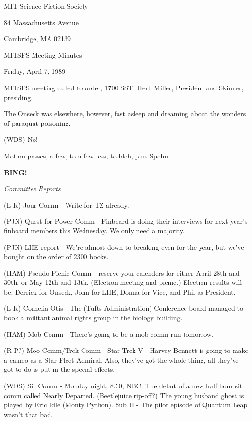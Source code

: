 \documentclass[12pt]{article}
\newcommand{\bing}{{\bf BING!} }
\newcommand{\goto}[1]{\bing \vskip 12pt \centerline{{\em{#1}}}}
\begin{document}
\begin{center}

MIT Science Fiction Society 

84 Massachusetts Avenue

Cambridge, MA 02139

\vspace{12pt}

MITSFS Meeting Minutes 

Friday, April 7, 1989

\end{center}
 
\vspace{18pt}

\setlength{\parskip}{6pt}

\noindent
MITSFS meeting called to order, 1700 SST, Herb Miller, President and Skinner, presiding. 

The Onseck was elsewhere, however, fast asleep and dreaming about the wonders of paraquat poisoning.

(WDS) No!

Motion passes, a few, to a few less, to bleh, plus Spehn.

\goto{Committee Reports}

(L K) Jour Comm - Write for TZ already.

(PJN) Quest for Power Comm - Finboard is doing their interviews for next year's finboard members this Wednesday. We only need a majority.

(PJN) LHE report - We're almost down to breaking even for the year, but we've bought on the order of 2300 books.

(HAM) Pseudo Picnic Comm - reserve your calenders for either April 28th and 30th, or May 12th and 13th. (Election meeting and picnic.) Election results will be: Derrick for Onseck, John for LHE, Donna for Vice, and Phil as President.

(L K) Cornelia Otis - The (Tufts Administration) Conference board managed to book a militant animal rights group in the biology building.

(HAM) Mob Comm - There's going to be a mob comm run tomorrow.

(R P?) Moo Comm/Trek Comm - Star Trek V - Harvey Bennett is going to make a cameo as a Star Fleet Admiral.  Also, they've got the whole thing, all they've got to do is put in the special effects.

(WDS) Sit Comm - Monday night, 8:30, NBC.  The debut of a new half hour sit comm called Nearly Departed.  (Beetlejuice rip-off?) The young husband ghost is played by Eric Idle (Monty Python). Sub II - The pilot episode of Quantum Leap wasn't that bad.
\end{document}
